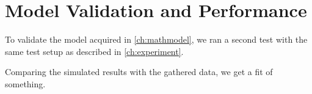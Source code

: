 \chapter{Model Validation and Performance}\label{ch:modValPerf}
To validate the model acquired in \ref{ch:mathmodel},
we ran a second test with the same test setup as described in \ref{ch:experiment}.


Comparing the simulated results with the gathered data,
we get a fit of  something.

